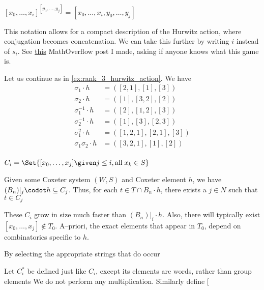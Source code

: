 \begin{remark}
	$[x_0, \ldots, x_i] ^ {[y_0, \ldots , y_j]} = [x_0, \ldots, x_i, y_0, \ldots, y_j]$
\end{remark}

This notation allows for a compact description of the Hurwitz action, where conjugation becomes concatenation.
We can take this further by writing $i$ instead of  $s_i$.
See \href{https://mathoverflow.net/questions/481777/tuple-rearrangement-a-combinatoric-problem-emerging-from-the-hurwitz-action-on}{this} MathOverflow post I made, asking if anyone knows what this game is.

\begin{example}
	Let us continue as in \cref{ex:rank_3_hurwitz_action}.
	We have
	\begin{align*}
		\sigma_1 \cdot h         & = ([2,1],[1],[3])     \\
		\sigma_2 \cdot h         & = ([1],[3,2],[2])     \\
		\sigma_1^{-1} \cdot h    & = ([2],[1,2],[3])     \\
		\sigma_2^{-1} \cdot h    & = ([1],[3],[2,3])     \\
		\sigma_1^2 \cdot h       & = ([1,2,1],[2,1],[3]) \\
		\sigma_1\sigma_2 \cdot h & =  ([3,2,1],[1],[2])  \\
	\end{align*}

\end{example}

\begin{theorem}
	$C_i = \Set{[x_0, \ldots, x_j] \given  j \leq i , \text{all} \; x_k \in S} $
\end{theorem}

\begin{theorem}
	Given some Coxeter system $(W, S)$ and Coxeter element $h$, we have $(B_n)|_j \codot h \subseteq C_j$.
	Thus, for each  $t \in T \cap B_n \cdot h$, there exists a $j \in N$ such that  $t \in C_j$
\end{theorem}

\begin{remark}
	These $C_i$ grow in size much faster than $(B_n)|_i \cdot h$.
	Also, there will typically exist $[x_0, \ldots, x_j] \notin T_0$.
	A--priori, the exact elements that appear in $T_0$, depend on combinatorics specific to $h$.
\end{remark}

\begin{theorem}
	By selecting the appropriate strings that do occur
\end{theorem}

\begin{definition}
	Let $C_i^*$ be defined just like  $C_i$, except its elements are words, rather than group elements
	We do not perform any multiplication.
	Similarly define $[$
\end{definition}

